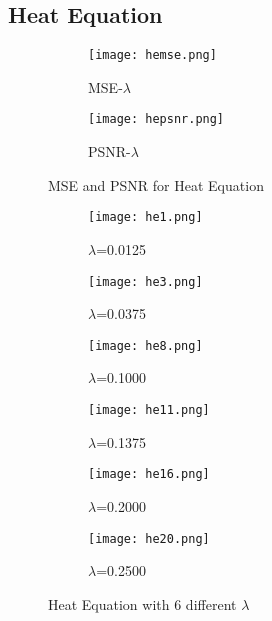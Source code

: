 \documentclass[12pt]{report}
\begin{document}
\begin{tableofcontents}
			\section{Heat Equation}
			\begin{figure}[H]
				\centering
				\captionsetup[subfigure]{labelformat=empty}
					\begin{subfigure}{0.49\textwidth}
                    \texttt{[image: hemse.png]}
                    \caption{MSE-$\lambda$}
					\end{subfigure}
					\begin{subfigure}{0.49\textwidth}
					\texttt{[image: hepsnr.png]}
                    \caption{PSNR-$\lambda$}
					\end{subfigure}
				\caption{MSE and PSNR for Heat Equation}
			\end{figure}
            \begin{figure}[H]
				\centering
				\begin{subfigure}{0.325\textwidth}
					\texttt{[image: he1.png]}
					\caption{$\lambda$=0.0125}
				\end{subfigure}
				\begin{subfigure}{0.325\textwidth}
					\texttt{[image: he3.png]}
					\caption{$\lambda$=0.0375}
				\end{subfigure}
				\begin{subfigure}{0.325\textwidth}
					\texttt{[image: he8.png]}
					\caption{$\lambda$=0.1000}
				\end{subfigure}
				\begin{subfigure}{0.325\textwidth}
					\texttt{[image: he11.png]}
					\caption{$\lambda$=0.1375}
				\end{subfigure}
				\begin{subfigure}{0.325\textwidth}
					\texttt{[image: he16.png]}
					\caption{$\lambda$=0.2000}
				\end{subfigure}
				\begin{subfigure}{0.325\textwidth}
					\texttt{[image: he20.png]}
					\caption{$\lambda$=0.2500}
				\end{subfigure}
				\caption{Heat Equation with 6 different $\lambda$}
			\end{figure}
            \begin{figure}[H]
				\centering
				\begin{subfigure}{0.325\textwidth}

\end{subfigure}
\end{figure}
\end{tableofcontents}
\end{document}
